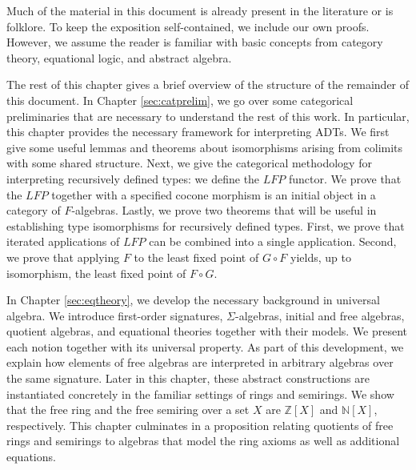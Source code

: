 \documentclass{msthesis}
\theoremstyle{definition}
\newcommand{\ints}{\mathbb{Z}}
\newcommand{\nat}{\mathbb{N}}
\begin{document}
Much of the material in this document is already present in the literature or is folklore. To keep the exposition self-contained, we include our own proofs.  However, we assume the reader is familiar with basic concepts from category theory, equational logic, and abstract algebra.

The rest of this chapter gives a brief overview of the structure of the remainder of this document.  In Chapter \ref{sec:catprelim}, we go over some categorical preliminaries that are necessary to understand the rest of this work.  In particular, this chapter provides the necessary framework for interpreting ADTs.  We first give some useful lemmas and theorems about isomorphisms arising from colimits with some shared structure. Next, we give the categorical methodology for interpreting recursively defined types: we define the $LFP$ functor.  We prove that the $LFP$ together with a specified cocone morphism is an initial object in a category of $F$-algebras.  Lastly, we prove two theorems that will be useful in establishing type isomorphisms for recursively defined types. First, we prove that iterated applications of $LFP$ can be combined into a single application.  Second, we prove that applying $F$ to the least fixed point of $G \circ F$ yields, up to isomorphism, the least fixed point of $F \circ G$.

In Chapter \ref{sec:eqtheory}, we develop the necessary background in universal algebra.  We introduce first-order signatures, $\Sigma$-algebras, initial and free algebras, quotient algebras, and equational theories together with their models.  We present each notion together with its universal property.  As part of this development, we explain how elements of free algebras are interpreted in arbitrary algebras over the same signature.  Later in this chapter, these abstract constructions are instantiated concretely in the familiar settings of rings and semirings.  We show that the free ring and the free semiring over a set $X$ are $\ints[X]$ and $\nat[X]$, respectively.  This chapter culminates in a proposition relating quotients of free rings and semirings to algebras that model the ring axioms as well as additional equations.
\end{document}
